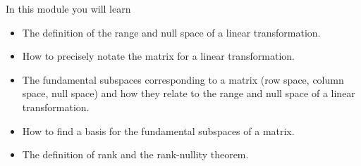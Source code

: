 \documentclass{problemset}
\newcommand{\bookonlynewpage}{\begin{bookonly}\newpage\end{bookonly}}
\begin{document}
\begin{module}

	In this module you will learn
	\begin{itemize}
		\item The definition of the range and null space of a linear transformation.
		\item How to precisely notate the matrix for a linear transformation.
		\item The fundamental subspaces corresponding to a matrix (row space, column space,
			null space) and how they relate to the range and null space of a linear transformation.
		\item How to find a basis for the fundamental subspaces of a matrix.
		\item The definition of rank and the rank-nullity theorem.
	\end{itemize}

	
\end{module}

	\bookonlynewpage
\end{document}

